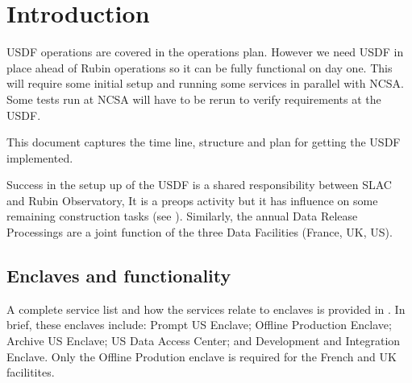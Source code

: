 \section{Introduction}
USDF operations are covered in the operations plan.
However we need \gls{USDF} in place ahead of Rubin  operations so it
can be fully functional on day one.
This will require some initial setup and running some services in parallel with \gls{NCSA}.
Some tests  run at NCSA will have to be rerun to verify requirements at the \gls{USDF}.

This document captures the time line, structure and plan for getting the \gls{USDF} implemented.

Success in the setup up of the \gls{USDF} is a shared responsibility between SLAC and Rubin Observatory,
It is a preops activity but it has influence on some remaining
construction tasks (see ). Similarly, the annual
Data Release Processings are a joint function of the three Data
Facilities (France, UK, US).

\subsection{Enclaves and functionality}\label{sec:enclaves}

A complete service list  and how the services relate to enclaves is provided in
. In brief, these enclaves include: Prompt US
Enclave; Offline Production Enclave; Archive US Enclave; US Data
Access Center; and Development and Integration Enclave. Only the
Offline Prodution enclave is required for the French and UK facilitites.
